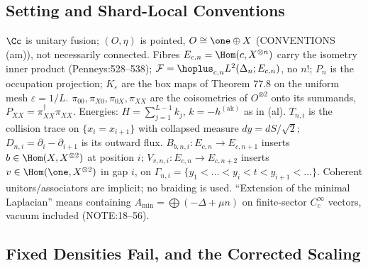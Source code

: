 \subsection{Setting and Shard-Local Conventions}
\label{sec:ncd-setting}

\(\Cc\) is unitary fusion; \((O,\eta)\) is pointed, \(O\cong\one\oplus X\) (CONVENTIONS (am)), not necessarily connected.
Fibres \(E_{c,n}=\Hom(c,X^{\otimes n})\) carry the isometry inner product (Penneys:528--538);
\(\mathcal F=\hoplus_{c,n}L^2(\Delta_n;E_{c,n})\), no \(n!\); \(P_n\) is the occupation projection; \(K_\varepsilon\) are the box maps of
Theorem 77.8 on the uniform mesh \(\varepsilon=1/L\).  \(\pi_{00},\pi_{X0},\pi_{0X},\pi_{XX}\) are the coisometries of
\(O^{\otimes2}\) onto its summands, \(P_{XX}=\pi_{XX}^\dagger\pi_{XX}\).  Energies: \(H=\sum_{j=1}^{L-1}k_j\), \(k=-h^{(\mathrm{ak})}\)
as in (al).  \(T_{n,i}\) is the collision trace on \(\{x_i=x_{i+1}\}\) with collapsed measure \(dy=dS/\sqrt2\);
\(D_{n,i}=\partial_i-\partial_{i+1}\) is its outward flux.  \(B_{b,n,i}:E_{c,n}\to E_{c,n+1}\) inserts \(b\in\Hom(X,X^{\otimes2})\) at
position \(i\); \(V_{v,n,i}:E_{c,n}\to E_{c,n+2}\) inserts \(v\in\Hom(\one,X^{\otimes2})\) in gap \(i\), on
\(\Gamma_{n,i}=\{y_1<\dots<y_i<t<y_{i+1}<\dots\}\).  Coherent unitors/associators are implicit; no braiding is used.
``Extension of the minimal Laplacian'' means containing \(A_{\min}=\bigoplus(-\Delta+\mu n)\) on finite-sector
\(C_c^\infty\) vectors, vacuum included (NOTE:18--56).

\subsection{Fixed Densities Fail, and the Corrected Scaling}

